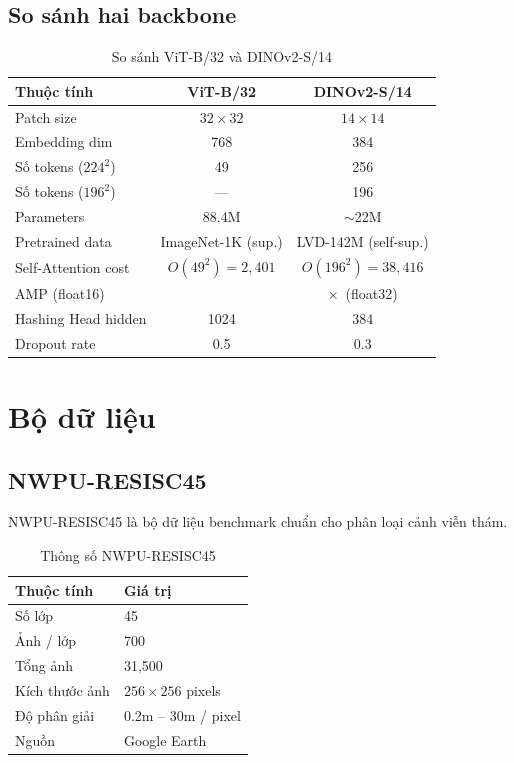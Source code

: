 \documentclass[13pt,a4paper]{article}
\newcommand{\tmark}{\checkmark}
\newcommand{\xmark}{$\times$}
\begin{document}
\subsection{So sánh hai backbone}

\begin{table}[H]
\centering
\caption{So sánh ViT-B/32 và DINOv2-S/14}
\label{tab:backbone_comparison}
\begin{tabular}{lcc}
\toprule
\textbf{Thuộc tính} & \textbf{ViT-B/32} & \textbf{DINOv2-S/14} \\
\midrule
Patch size              & $32\times32$          & $14\times14$ \\
Embedding dim           & 768                   & 384 \\
Số tokens ($224^2$)     & 49                    & 256 \\
Số tokens ($196^2$)     & ---                   & 196 \\
Parameters              & 88.4M                 & $\sim$22M \\
Pretrained data         & ImageNet-1K (sup.)    & LVD-142M (self-sup.) \\
Self-Attention cost     & $O(49^2)=2{,}401$     & $O(196^2)=38{,}416$ \\
AMP (float16)           & \tmark                & \xmark~(float32) \\
Hashing Head hidden     & 1024                  & 384 \\
Dropout rate            & 0.5                   & 0.3 \\
\bottomrule
\end{tabular}
\end{table}


\section{Bộ dữ liệu}

\subsection{NWPU-RESISC45}

NWPU-RESISC45 \cite{cheng2017remote} là bộ dữ liệu benchmark chuẩn cho phân loại cảnh viễn thám.

\begin{table}[H]
\centering
\caption{Thông số NWPU-RESISC45}
\label{tab:nwpu}
\begin{tabular}{ll}
\toprule
\textbf{Thuộc tính} & \textbf{Giá trị} \\
\midrule
Số lớp          & 45 \\
Ảnh / lớp       & 700 \\
Tổng ảnh        & 31{,}500 \\
Kích thước ảnh  & $256 \times 256$ pixels \\
Độ phân giải    & 0.2m -- 30m / pixel \\
Nguồn           & Google Earth \\
\bottomrule
\end{tabular}
\end{table}
\end{document}
